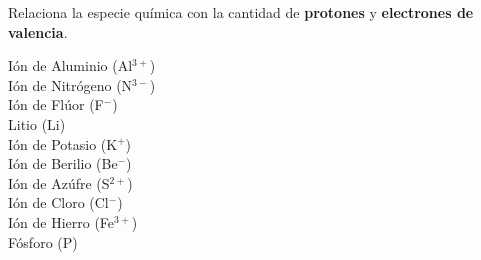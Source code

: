 Relaciona la especie química con la cantidad de \textbf{protones} y \textbf{electrones de valencia}.

\begin{multicols}{3}
    \begin{choices}
        \choice Ión de Aluminio  (Al$^{3+}$) \\ 
        \choice Ión de Nitrógeno (N$^{3-}$) \\  
        \choice Ión de Flúor   (F$^-$) \\  
        \choice Litio (Li) \\ 
        \choice Ión de Potasio (K$^+$) \\ 
        \choice Ión de Berilio (Be$^{-}$) \\  
        \choice Ión de Azúfre (S$^{2+}$) \\ 
        \choice Ión de Cloro (Cl$^{-}$) \\ 
        \choice Ión de Hierro (Fe$^{3+}$)  \\  
        \choice Fósforo (P)    \\  
    \end{choices}
\end{multicols}

